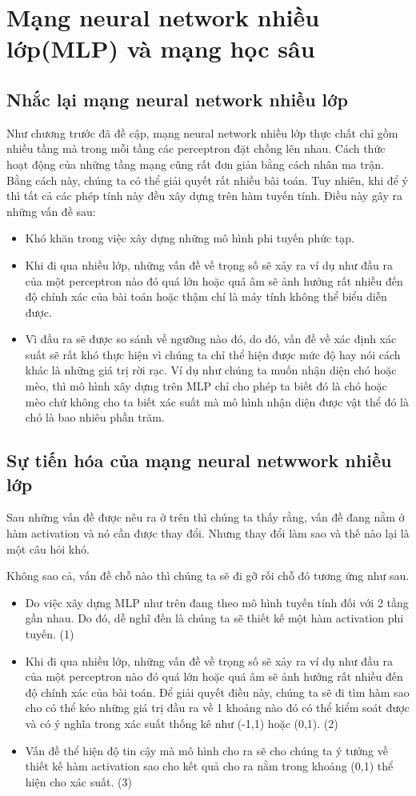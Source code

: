 \section{Mạng neural network nhiều lớp(MLP) và mạng học sâu}
\subsection{Nhắc lại mạng neural network nhiều lớp}
Như chương trước đã đề cập, mạng neural network nhiều lớp thực chất chỉ gồm nhiều tầng mà trong mỗi tầng các perceptron đặt chồng lên nhau. Cách thức hoạt động của những tầng mạng cũng rất đơn giản bằng cách nhân ma trận. Bằng cách này, chúng ta có thể giải quyết rất nhiều bài toán. Tuy nhiên, khi để ý thì tất cả các phép tính này đều xây dựng trên hàm tuyến tính. Điều này gây ra những vấn đề sau:
\begin{itemize}
    \item Khó khăn trong việc xây dựng những mô hình phi tuyến phức tạp.
    \item Khi đi qua nhiều lớp, những vấn đề về trọng số sẽ xảy ra ví dụ như đầu ra của một perceptron nào đó quá lớn hoặc quá âm sẽ ảnh hưởng rất nhiều đến độ chính xác của bài toán hoặc thậm chí là máy tính không thể biểu diễn được.
    \item Vì đầu ra sẽ được so sánh về ngưỡng nào đó, do đó, vấn đề về xác định xác suất sẽ rất khó thực hiện vì chúng ta chỉ thể hiện được mức độ hay nói cách khác là những giá trị rời rạc. Ví dụ như chúng ta muốn nhận diện chó hoặc mèo, thì mô hình xây dựng trên MLP chỉ cho phép ta biết đó là chó hoặc mèo chứ không cho ta biết xác suất mà mô hình nhận diện được vật thể đó là chó là bao nhiêu phần trăm.
\end{itemize}

\subsection{Sự tiến hóa của mạng neural netwwork nhiều lớp}
Sau những vấn đề được nêu ra ở trên thì chúng ta thấy rằng, vấn đề đang nằm ở hàm activation và nó cần được thay đổi. Nhưng thay đổi làm sao và thế nào lại là một câu hỏi khó.

Không sao cả, vấn đề chỗ nào thì chúng ta sẽ đi gỡ rối chỗ đó tương ứng như sau. 
\begin{itemize}
    \item Do việc xây dựng MLP như trên đang theo mô hình tuyến tính đối với 2 tầng gần nhau. Do đó, dễ nghĩ đến là chúng ta sẽ thiết kế một hàm activation phi tuyến. (1)
    \item Khi đi qua nhiều lớp, những vấn đề về trọng số sẽ xảy ra ví dụ như đầu ra của một perceptron nào đó quá lớn hoặc quá âm sẽ ảnh hưởng rất nhiều đến độ chính xác của bài toán. Để giải quyết điều này, chúng ta sẽ đi tìm hàm sao cho có thể kéo những giá trị đầu ra về 1 khoảng nào đó có thể kiểm soát được và có ý nghĩa trong xác suất thống kê như (-1,1) hoặc (0,1). (2)
    \item Vấn đề thể hiện độ tin cậy mà mô hình cho ra sẽ cho chúng ta ý tưởng về thiết kế hàm activation sao cho kết quả cho ra nằm trong khoảng (0,1) thể hiện cho xác suất. (3) 
\end{itemize}


